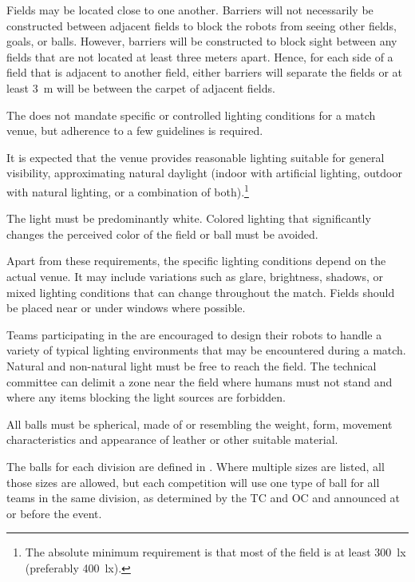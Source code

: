 Fields may be located close to one another.
Barriers will not necessarily be constructed between adjacent fields to block the robots from seeing other fields, goals, or balls. 
However, barriers will be constructed to block sight between any fields that are not located at least three meters apart.
Hence, for each side of a field that is adjacent to another field, either barriers will separate the fields or at least \qty{3}{\metre} will be between the carpet of adjacent fields.

\label{sec:lightingConditions}

The \leaguenameabbr does not mandate specific or controlled lighting conditions for a match venue, but adherence to a few guidelines is required.

It is expected that the venue provides reasonable lighting suitable for general visibility, approximating natural daylight (\eg indoor with artificial lighting, outdoor with natural lighting, or a combination of both).\footnote{The absolute minimum requirement is that most of the field is at least \qty{300}{\lux} (preferably \qty{400}{\lux}).}

The light must be predominantly white. Colored lighting that significantly changes the perceived color of the field or ball must be avoided.

Apart from these requirements, the specific lighting conditions depend on the actual venue. It may include variations such as glare, brightness, shadows, or mixed lighting conditions that can change throughout the match. Fields should be placed near or under windows where possible.

Teams participating in the \leaguenameabbr are encouraged to design their robots to handle a variety of typical lighting environments that may be encountered during a match. Natural and non-natural light must be free to reach the field. The technical committee can delimit a zone near the field where humans must not stand and where any items blocking the light sources are forbidden.

\label{sec:ball}

\label{sec:ball-measurements}

All balls must be spherical, made of or resembling the weight, form, movement characteristics and appearance of leather or other suitable material.

The balls for each division are defined in . Where multiple sizes are listed, all those sizes are allowed, but each competition will use one type of ball for all teams in the same division, as determined by the TC and OC and announced at or before the event.


